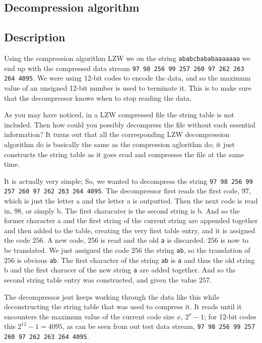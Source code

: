 \begin{refsection}
\section{Decompression algorithm}

\subsection{Description}

Using the compression algorithm LZW we on the string
\texttt{ababcbababaaaaaaa} we end up with the compressed data stream
\texttt{97 98 256 99 257 260 97 262 263 264 4095}. We were using
12-bit codes to encode the data, and so the maximum value of an
unsigned 12-bit number is used to terminate it. This is to make sure
that the decompressor knows when to stop reading the data.

As you may have noticed, in a LZW compressed file the string table is
not included. Then how could you possibly decompress the file without
such essential information? It turns out that all the corresponding
LZW decompression algorithm do is basically the same as the
compression aglorithm do; it just constructs the string table as it
goes read and compresses the file at the same time.

It is actually very simple; So, we wanted to decompress the string
\texttt{97 98 256 99 257 260 97 262 263 264 4095}. The decompressor
first reads the first code, $97$, which is just the letter a and the
letter a is outputted. Then the next code is read in, $98$, or simply
b. The first characater is the second string is b. And so the former
character a and the first string of the current string are appended
together and then added to the table, creating the very first table
entry,  and it is assigned the code $256$. A new code,
256 is read and the old \texttt{a} is discarded. $256$ is now to be
translated. We just assigned the code $256$ the string \texttt{ab}, so
the translation of $256$ is obvious \texttt{ab}. The first character
of the string \texttt{ab} is \texttt{a} and thus the old string b and
the first characer of the new string \texttt{a} are added
together. And so ths second string table entry was constructed, and
given the value $257$.

The decompressor jsut keeps working through the data like this while
deconstructing the string table that was used to compress it. It reads
until it encounters the maximum value of the current code size $x$,
$2^{x}-1$; for 12-bit codes this $2^{12} - 1 = 4095$, as can be seen
from out test data stream, \texttt{97 98 256 99 257 260 97 262 263 264
  4095}.


\end{refsection}
